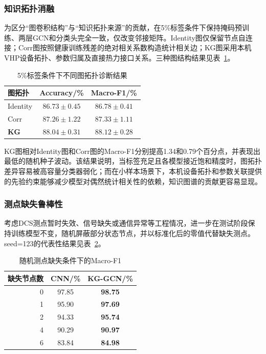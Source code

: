 \subsubsection{知识拓扑消融}

为区分“图卷积结构”与“知识拓扑来源”的贡献，在5\%标签条件下保持掩码预训练、两层GCN和分类头完全一致，仅改变邻接矩阵。Identity图仅保留节点自连接；Corr图按照健康训练残差的绝对相关系数构造统计相关边；KG图采用本机VHP设备拓扑、参数归属及直接热力接口关系。三种图结构结果见表~\ref{tab:graph_ablation05_v3}。

\begin{table}[htbp]
    \centering
    \caption{5\%标签条件下不同图拓扑诊断结果}
    \label{tab:graph_ablation05_v3}
    \begin{tabular}{lcc}
        \toprule
        图拓扑 & Accuracy/\% & Macro-F1/\% \\
        \midrule
        Identity & $86.73\pm0.45$ & $86.78\pm0.41$ \\
        Corr & $87.26\pm1.22$ & $87.33\pm1.11$ \\
        \textbf{KG} & $\mathbf{88.04\pm0.31}$ & $\mathbf{88.12\pm0.28}$ \\
        \bottomrule
    \end{tabular}
\end{table}

KG图相对Identity图和Corr图的Macro-F1分别提高1.34和0.79个百分点，并表现出最低的随机种子波动。该结果说明，当标签充足且各模型接近饱和精度时，图拓扑差异容易被高容量分类器弱化；而在小样本场景下，本机设备拓扑和参数关联提供的先验约束能够减少模型对偶然统计相关性的依赖，知识图谱的贡献更容易显现。

\subsubsection{测点缺失鲁棒性}

考虑DCS测点暂时失效、信号缺失或通信异常等工程情况，进一步在测试阶段保持训练模型不变，随机屏蔽部分状态节点，并以标准化后的零值代替缺失测点。seed=123的代表性结果见表~\ref{tab:missing_random_v3}。

\begin{table}[htbp]
    \centering
    \caption{随机测点缺失条件下的Macro-F1}
    \label{tab:missing_random_v3}
    \begin{tabular}{rcc}
        \toprule
        缺失节点数 & CNN/\% & KG-GCN/\% \\
        \midrule
        0 & 97.85 & \textbf{98.75} \\
        1 & 95.90 & \textbf{97.69} \\
        2 & 94.33 & \textbf{95.74} \\
        4 & 90.29 & \textbf{90.97} \\
        6 & 83.84 & \textbf{84.98} \\
        \bottomrule
    \end{tabular}
\end{table}

